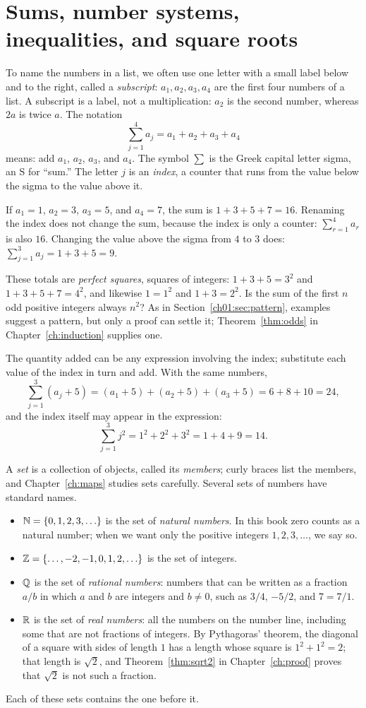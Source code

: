 \section{Sums, number systems, inequalities, and square roots}\label{ch01:sec:notation}
To name the numbers in a list, we often use one letter with a small label below and to the right, called a \emph{subscript}: $a_1,a_2,a_3,a_4$ are the first four numbers of a list. A subscript is a label, not a multiplication: $a_2$ is the second number, whereas $2a$ is twice $a$. The notation
\[
\sum_{j=1}^{4}a_j=a_1+a_2+a_3+a_4
\]
means: add $a_1$, $a_2$, $a_3$, and $a_4$. The symbol $\sum$ is the Greek capital letter sigma, an S for ``sum.'' The letter $j$ is an \emph{index}, a counter that runs from the value below the sigma to the value above it.

If $a_1=1$, $a_2=3$, $a_3=5$, and $a_4=7$, the sum is $1+3+5+7=16$. Renaming the index does not change the sum, because the index is only a counter: $\sum_{r=1}^{4}a_r$ is also $16$. Changing the value above the sigma from $4$ to $3$ does: $\sum_{j=1}^{3}a_j=1+3+5=9$.

These totals are \emph{perfect squares}, squares of integers: $1+3+5=3^2$ and $1+3+5+7=4^2$, and likewise $1=1^2$ and $1+3=2^2$. Is the sum of the first $n$ odd positive integers always $n^2$? As in Section~\ref{ch01:sec:pattern}, examples suggest a pattern, but only a proof can settle it; Theorem~\ref{thm:odds} in Chapter~\ref{ch:induction} supplies one.

The quantity added can be any expression involving the index; substitute each value of the index in turn and add. With the same numbers,
\[
\sum_{j=1}^{3}(a_j+5)=(a_1+5)+(a_2+5)+(a_3+5)=6+8+10=24,
\]
and the index itself may appear in the expression:
\[
\sum_{j=1}^{3}j^2=1^2+2^2+3^2=1+4+9=14.
\]

A \emph{set} is a collection of objects, called its \emph{members}; curly braces list the members, and Chapter~\ref{ch:maps} studies sets carefully. Several sets of numbers have standard names.
\begin{itemize}
\item $\mathbb N=\{0,1,2,3,\ldots\}$ is the set of \emph{natural numbers}. In this book zero counts as a natural number; when we want only the positive integers $1,2,3,\ldots$, we say so.
\item $\mathbb Z=\{\ldots,-2,-1,0,1,2,\ldots\}$ is the set of integers.
\item $\mathbb Q$ is the set of \emph{rational numbers}: numbers that can be written as a fraction $a/b$ in which $a$ and $b$ are integers and $b\ne0$, such as $3/4$, $-5/2$, and $7=7/1$.
\item $\mathbb R$ is the set of \emph{real numbers}: all the numbers on the number line, including some that are not fractions of integers. By Pythagoras' theorem, the diagonal of a square with sides of length $1$ has a length whose square is $1^2+1^2=2$; that length is $\sqrt2$, and Theorem~\ref{thm:sqrt2} in Chapter~\ref{ch:proof} proves that $\sqrt2$ is not such a fraction.
\end{itemize}
Each of these sets contains the one before it.


